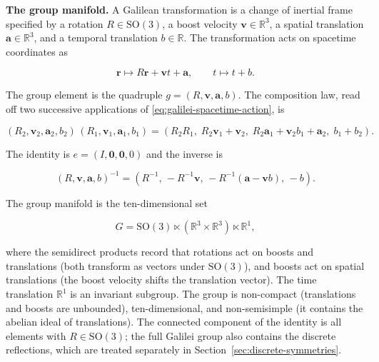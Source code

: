 \medskip\noindent\textbf{The group manifold.} A Galilean transformation is a change of inertial frame specified by a rotation $R\in\mathrm{SO}(3)$, a boost velocity $\bm v\in\mathbb{R}^{3}$, a spatial translation $\bm a\in\mathbb{R}^{3}$, and a temporal translation $b\in\mathbb{R}$. The transformation acts on spacetime coordinates as
\begin{linenomath}
\begin{equation}
\bm r \mapsto R\bm r + \bm v t + \bm a,\qquad t \mapsto t + b .
\label{eq:galilei-spacetime-action}
\end{equation}
\end{linenomath}
The group element is the quadruple $g = (R,\bm v,\bm a,b)$. The composition law, read off two successive applications of \eqref{eq:galilei-spacetime-action}, is
\begin{linenomath}
\begin{equation}
(R_{2},\bm v_{2},\bm a_{2},b_{2})\,(R_{1},\bm v_{1},\bm a_{1},b_{1})
= (R_{2}R_{1},\;R_{2}\bm v_{1}+\bm v_{2},\;R_{2}\bm a_{1}+\bm v_{2}b_{1}+\bm a_{2},\;b_{1}+b_{2}) .
\label{eq:galilei-composition}
\end{equation}
\end{linenomath}
The identity is $e=(I,\bm 0,\bm 0,0)$ and the inverse is
\begin{linenomath}
\begin{equation}
(R,\bm v,\bm a,b)^{-1} = (R^{-1},\,-R^{-1}\bm v,\,-R^{-1}(\bm a-\bm v b),\,-b).
\label{eq:galilei-inverse}
\end{equation}
\end{linenomath}
The group manifold is the ten-dimensional set
\begin{linenomath}
\begin{equation}
G = \mathrm{SO}(3)\ltimes(\mathbb{R}^{3}\times\mathbb{R}^{3})\ltimes\mathbb{R}^{1},
\label{eq:galilei-manifold}
\end{equation}
\end{linenomath}
where the semidirect products record that rotations act on boosts and translations (both transform as vectors under $\mathrm{SO}(3)$), and boosts act on spatial translations (the boost velocity shifts the translation vector). The time translation $\mathbb{R}^{1}$ is an invariant subgroup. The group is non-compact (translations and boosts are unbounded), ten-dimensional, and non-semisimple (it contains the abelian ideal of translations). The connected component of the identity is all elements with $R\in\mathrm{SO}(3)$; the full Galilei group also contains the discrete reflections, which are treated separately in Section~\ref{sec:discrete-symmetries}.

